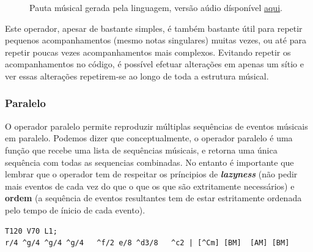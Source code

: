 \begin{figure}[ht]
  \centering
  {%
  \setlength{\fboxsep}{0pt}%
  \setlength{\fboxrule}{0pt}%
  }%
  \caption{Pauta músical gerada pela linguagem, versão aúdio dísponível \href{https://drive.google.com/open?id=1IIm8PQkLsNFMK9MNSVubJSG6SP6KwhPL}{\underline{aqui}}\protect\footnotemark.}
  \label{fig:ops-repetition}
\end{figure}


Este operador, apesar de bastante simples, é também bastante útil para repetir pequenos acompanhamentos (mesmo notas singulares) muitas vezes, ou até para repetir poucas vezes acompanhamentos mais complexos. Evitando repetir os acompanhamentos no código, é possível efetuar alterações em apenas um sítio e ver essas alterações repetirem-se ao longo de toda a estrutura músical.

\subsubsection{Paralelo}
O operador paralelo permite reproduzir múltiplas sequências de eventos músicais em paralelo. Podemos dizer que conceptualmente, o operador paralelo é uma função que recebe uma lista de sequências músicais, e retorna uma única sequência com todas as sequencias combinadas. No entanto é importante que lembrar que o operador tem de respeitar os príncipios de \textit{\textbf{lazyness}} (não pedir mais eventos de cada vez do que o que os que são extritamente necessários) e \textbf{ordem} (a sequência de eventos resultantes tem de estar estritamente ordenada pelo tempo de ínicio de cada evento).

\begin{lstlisting}[caption={Excerto da música \textit{Soft to Be Strong} de Marina},label=lst:ops-parallel,belowcaptionskip=-\medskipamount]
T120 V70 L1;
r/4 ^g/4 ^g/4 ^g/4   ^f/2 e/8 ^d3/8   ^c2 | [^Cm] [BM]  [AM] [BM] 
\end{lstlisting}

